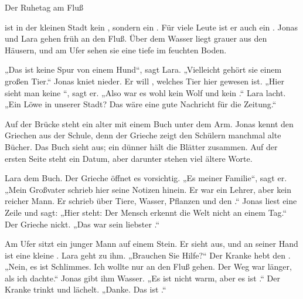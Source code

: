 \documentclass[12pt]{nextbook}
\begin{document}
\begin{readersection}{Der Ruhetag am Fluß}

 ist in der kleinen Stadt kein , sondern ein . Für viele Leute ist er auch ein . Jonas und Lara gehen früh an den Fluß. Über dem Wasser liegt grauer  aus den Häusern, und am Ufer sehen sie eine tiefe  im feuchten Boden.

„Das ist keine Spur von einem Hund“, sagt Lara. „Vielleicht gehört sie einem großen Tier.“ Jonas kniet nieder. Er will , welches Tier hier gewesen ist. „Hier sieht man keine “, sagt er. „Also war es wohl kein Wolf und kein .“ Lara lacht. „Ein Löwe in unserer Stadt? Das wäre eine gute Nachricht für die Zeitung.“

Auf der Brücke steht ein alter  mit einem Buch unter dem Arm. Jonas kennt den Griechen aus der Schule, denn der Grieche zeigt den Schülern manchmal alte Bücher. Das Buch sieht  aus; ein dünner  hält die Blätter zusammen. Auf der ersten Seite steht ein  Datum, aber darunter stehen viel ältere Worte.

Lara  dem Buch. Der Grieche öffnet es vorsichtig. „Es  meiner Familie“, sagt er. „Mein Großvater schrieb hier seine Notizen hinein. Er war ein  Lehrer, aber kein reicher Mann. Er schrieb über Tiere, Wasser, Pflanzen und den .“ Jonas liest eine Zeile und sagt: „Hier steht: Der Mensch erkennt die Welt nicht an einem Tag.“ Der Grieche nickt. „Das war sein liebster .“

Am Ufer sitzt ein junger Mann auf einem Stein. Er sieht  aus, und an seiner Hand ist eine kleine . Lara geht zu ihm. „Brauchen Sie Hilfe?“ Der Kranke hebt den . „Nein, es ist  Schlimmes. Ich wollte nur an den Fluß gehen. Der Weg war länger, als ich dachte.“ Jonas gibt ihm Wasser. „Es ist nicht warm, aber es ist .“ Der Kranke trinkt und lächelt. „Danke. Das ist .“


\end{readersection}
\end{document}
